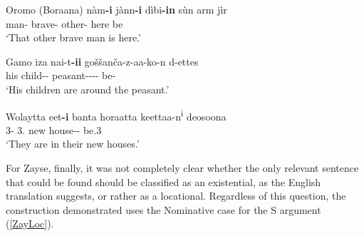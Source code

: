 \begin{exe}\ex\label{BorLoc} {Oromo (Boraana)} \citep[Eastern Cushitic; Kenya; ][54]{Owens:1982}\nopagebreak[4]
\gll n\`am\textbf{-i} j\`ann\textbf{-i} d\`ibi\textbf{-in} s\`un arm j\`ir \\
man-\nom{} brave-\nom{} other-\nom{} \dem{} here be\\
\glt `That other brave man is here.' 
\end{exe}

\pagebreak 
\begin{exe}\ex\label{GamLoc} {Gamo} \citep[Omotic; Ethiopia; ][384]{Hompo:1990}\nopagebreak[4]
 \gll iza na\textglotstop i-t\textbf{-ii} go\v s\v san\v ca-z-aa-ko-n d-ettes\\
his child-\pl{}-\nom{} peasant--\acc{}-\com{}-\loc{} be-\complx{}\\
\glt `His children are around the peasant.'
\end{exe}

\begin{exe}\ex\label{WolLoc} {Wolaytta} \citep[Omotic; Ethiopia; ][587, ex: 332]{Lamberti:1997}\nopagebreak[4]
\gll eet\textbf{-i} banta horaatta keettaa-n\textsuperscript{i} de\textglotstop osoona\\
3\pl{}-\nom{} 3\pl{}.\poss{} new house-\pl{}-\loc{} be.3\pl{}\\
\glt `They are in their new houses.' 
\end{exe}

For Zayse, finally, it was not completely clear whether the only relevant sentence that could be found should be classified as an existential, as the English translation suggests, or rather as a locational. 
Regardless of this question, the construction demonstrated uses the Nominative case for the S argument (\ref{ZayLoc}). 

